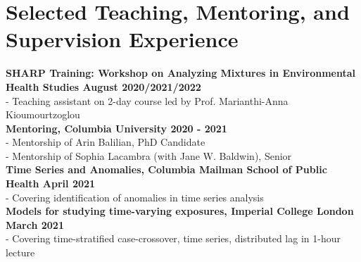 \section*{Selected Teaching, Mentoring, and Supervision Experience}


\noindent \textbf{SHARP Training: Workshop on Analyzing Mixtures in Environmental Health Studies \hfill August 2020/2021/2022}\\
\noindent - Teaching assistant on 2-day course led by Prof. Marianthi-Anna Kioumourtzoglou\\

\noindent \textbf{Mentoring, Columbia University \hfill 2020 - 2021}\\
\noindent - Mentorship of Arin Balilian, PhD Candidate\\
\noindent - Mentorship of Sophia Lacambra (with Jane W. Baldwin), Senior\\

\noindent \textbf{Time Series and Anomalies, Columbia Mailman School of Public Health \hfill April 2021}\\
\noindent - Covering identification of anomalies in time series analysis\\


\noindent \textbf{Models for studying time-varying exposures, Imperial College London \hfill March 2021}\\
\noindent - Covering time-stratified case-crossover, time series, distributed lag in 1-hour lecture\\



